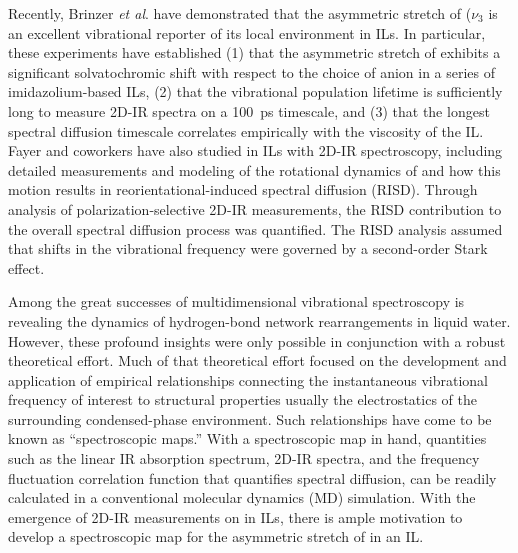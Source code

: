 \documentclass[%
  class = book,%
  crop = false,%
  float = true,%
  multi = true,%
  preview = false,%
]{standalone}
\let\cite\autocite
\begin{document}
Recently, Brinzer \emph{et al}. have demonstrated that the asymmetric stretch of  (\(\nu_3\) is an excellent vibrational reporter of its local environment in ILs.\cite{Brinzer2015} In particular, these experiments have established (1) that the asymmetric stretch of  exhibits a significant solvatochromic shift with respect to the choice of anion in a series of imidazolium-based ILs, (2) that the  vibrational population lifetime is sufficiently long to measure 2D-IR spectra on a \SI{100}{\pico\second} timescale, and (3) that the longest spectral diffusion timescale correlates empirically with the viscosity of the IL.\cite{Brinzer2015} Fayer and coworkers have also studied  in ILs with 2D-IR spectroscopy, including detailed measurements and modeling of the rotational dynamics of  and how this motion results in reorientational-induced spectral diffusion (RISD). Through analysis of polarization-selective 2D-IR measurements, the RISD contribution to the overall spectral diffusion process was quantified.\cite{Giammanco2016d,Giammanco2016} The RISD analysis assumed that shifts in the  vibrational frequency were governed by a second-order Stark effect.

Among the great successes of multidimensional vibrational spectroscopy is revealing the dynamics of hydrogen-bond network rearrangements in liquid water.\cite{asburyJCP-04,Asbury2004,Bakker2010,feckoSci-03,eavesPNAS-05,Gruenbaum2013,Jansen2010,loparoJCP-06a,loparoJCP-06b,Nibbering2004,Nicodemus2011,nicodemusJPCL-10,ramaseshaJCP-11,Roberts2009} However, these profound insights were only possible in conjunction with a robust theoretical effort.\cite{Lee2011,feckoSci-03,eavesPNAS-05,Gruenbaum2013,auer_hydrogen_2007,auer_ir_2008,corcelliJCP-04a,Hayashi2005,Jansen2009,Li2010,Chai2008,lin_water_2009-1,Paarmann2009,Pieniazek2009,shiJPCB-12,Skinner2009,Tainter2012,Yang2011,laageCPL-06,Laage2006,Laage2008,Laage2012,Laage2012a,Smith2005} Much of that theoretical effort focused on the development and application of empirical relationships connecting the instantaneous vibrational frequency of interest to structural properties \textemdash{} usually the electrostatics \textemdash{} of the surrounding condensed-phase environment.\cite{steinelCPL-04,auer_ir_2008,Li2006} Such relationships have come to be known as ``spectroscopic maps.'' With a spectroscopic map in hand, quantities such as the linear IR absorption spectrum, 2D-IR spectra, and the frequency fluctuation correlation function that quantifies spectral diffusion, can be readily calculated in a conventional molecular dynamics (MD) simulation.\cite{lin_water_2009-1,Li2006,Terranova2014} With the emergence of 2D-IR measurements on  in ILs, there is ample motivation to develop a spectroscopic map for the asymmetric stretch of  in an IL.
\end{document}
